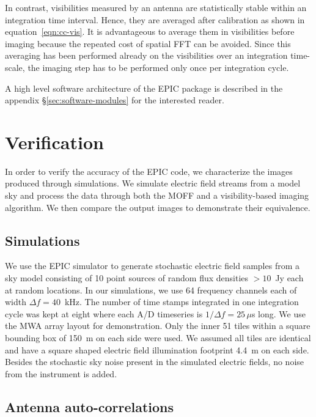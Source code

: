 \documentclass[a4paper,fleqn,usenatbib]{mnras}
\begin{document}
In contrast, visibilities measured by an antenna are statistically stable within
an integration time interval. Hence, they are averaged after calibration as shown
in equation~\ref{eqn:cc-vis}. It is advantageous to average them in visibilities
before imaging because the repeated cost of spatial FFT can be avoided. Since 
this averaging has been performed already on the visibilities over an integration 
time-scale, the imaging step has to be performed only once per integration cycle. 

A high level software architecture of the EPIC package is described in the 
appendix \S\ref{sec:software-modules} for the interested reader.

\section{Verification}\label{sec:verify}

In order to verify the accuracy of the EPIC code, we characterize the images 
produced through simulations. We simulate electric field streams from a model 
sky and process the data through both the MOFF and a visibility-based imaging 
algorithm. We then compare the output images to demonstrate their equivalence.

\subsection{Simulations}\label{sec:sim}

We use the EPIC simulator to generate stochastic electric field samples from a sky model consisting of 10 point sources of random flux densities $>10$~Jy each at random locations. In our simulations, we use 64 frequency channels each of width $\Delta f = 40$~kHz. The number of time stamps integrated in one integration cycle was kept at eight where each A/D timeseries is $1/\Delta f=25\,\mu$s long. We use the MWA array layout \citep{bea12} for demonstration. Only the inner 51 tiles within a square bounding box of 150~m on each side were used. We assumed all tiles are identical and have a square shaped electric field illumination footprint 4.4~m on each side. Besides the stochastic sky noise present in the simulated electric fields, no noise from the instrument is added.

\subsection{Antenna auto-correlations}\label{sec:rm-autocorr}
\end{document}
